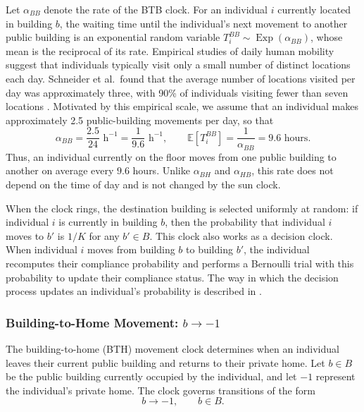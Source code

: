 \documentclass[11pt]{article}
\theoremstyle{definition}
\theoremstyle{plain}
\begin{document}
Let $\alpha_{BB}$ denote the rate of the BTB clock. For an individual $i$ currently located in building $b$, the waiting time until the individual's next movement to another public building is an exponential random variable $T_i^{BB}\sim\operatorname{Exp}(\alpha_{BB})$, whose mean is the reciprocal of its rate.
Empirical studies of daily human mobility suggest that individuals typically
visit only a small number of distinct locations each day. Schneider et al.\
found that the average number of locations visited per day was approximately
three, with 90\% of individuals visiting fewer than seven locations \cite{schneider2013}. Motivated by this empirical scale, we assume that an
individual makes approximately 2.5 public-building movements per day, so that
\[
\alpha_{BB}=\frac{2.5}{24}\text{ h}^{-1}=\frac{1}{9.6}\text{ h}^{-1},
\qquad
\mathbb{E}\left[T_i^{BB}\right]=\frac{1}{\alpha_{BB}}=9.6\text{ hours}.
\]
Thus, an individual currently on the floor moves from one public building to another on average every $9.6$ hours. Unlike $\alpha_{BH}$ and $\alpha_{HB}$, this rate does not depend on the time of day and is not changed by the sun clock.

When the clock rings, the destination building is selected uniformly at random: if individual $i$ is currently in building $b$, then the probability that individual $i$ moves to $b'$ is $1/K$ for any $b' \in B$.
This clock also works as a decision clock. When individual $i$ moves from building $b$ to building $b'$, the individual recomputes their compliance probability and performs a Bernoulli trial with this probability to update their compliance status. The way in which the decision process updates an individual's probability is described in .

\subsubsection{Building-to-Home Movement: \texorpdfstring{$b\rightarrow -1$}{b to home}}
\label{sec:bth}

The building-to-home (BTH) movement clock determines when an individual leaves their current public building and returns to their private home. Let $b\in B$ be the public building currently occupied by the individual, and let $-1$ represent the individual's private home. The clock governs transitions of the form
\begin{equation}
b\longrightarrow -1,
\qquad  b\in B.
\end{equation}
\end{document}
